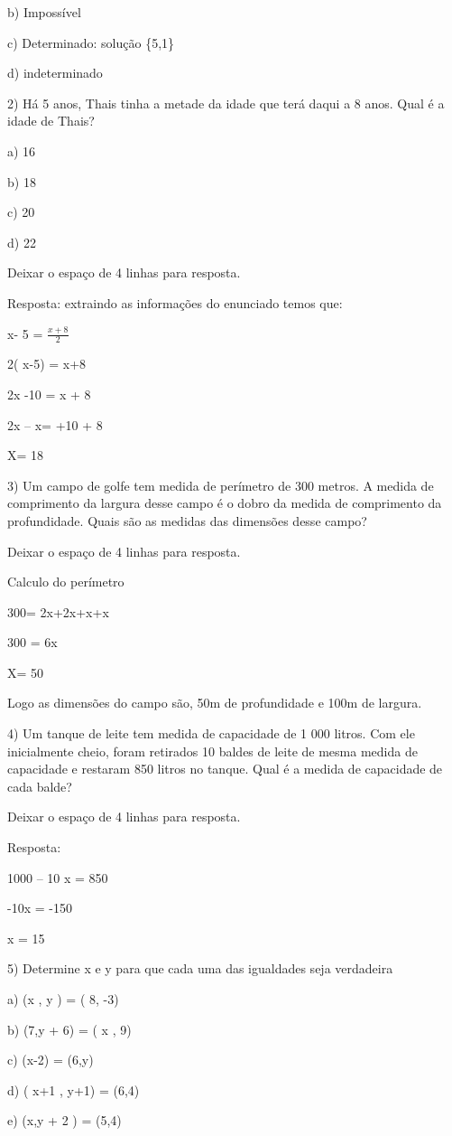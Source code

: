 b) Impossível

c) Determinado: solução \{5,1\}

d) indeterminado

2) Há 5 anos, Thais tinha a metade da idade que terá daqui a 8 anos.
Qual é a idade de Thais?

a) 16

b) 18

c) 20

d) 22

Deixar o espaço de 4 linhas para resposta.

Resposta: extraindo as informações do enunciado temos que:

x- 5 = \(\frac{x + 8}{2}\)

2( x-5) = x+8

2x -10 = x + 8

2x -- x= +10 + 8

X= 18

3) Um campo de golfe tem medida de perímetro de 300 metros. A medida de
comprimento da largura desse campo é o dobro da medida de comprimento da
profundidade. Quais são as medidas das dimensões desse campo?

Deixar o espaço de 4 linhas para resposta.

Calculo do perímetro

300= 2x+2x+x+x

300 = 6x

X= 50

Logo as dimensões do campo são, 50m de profundidade e 100m de largura.

4) Um tanque de leite tem medida de capacidade de 1 000 litros. Com ele
inicialmente cheio, foram retirados 10 baldes de leite de mesma medida
de capacidade e restaram 850 litros no tanque. Qual é a medida de
capacidade de cada balde?

Deixar o espaço de 4 linhas para resposta.

Resposta:

1000 -- 10 x = 850

-10x = -150

x = 15

5) Determine x e y para que cada uma das igualdades seja verdadeira

a) (x , y ) = ( 8, -3)

b) (7,y + 6) = ( x , 9)

c) (x-2) = (6,y)

d) ( x+1 , y+1) = (6,4)

e) (x,y + 2 ) = (5,4)

